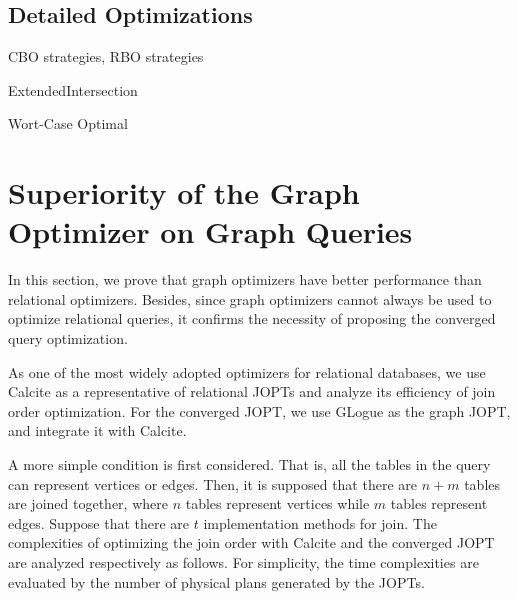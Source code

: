 \documentclass[sigconf, nonacm]{acmart}
\begin{document}
\subsection{Detailed Optimizations}

CBO strategies, RBO strategies

ExtendedIntersection

Wort-Case Optimal



\section{Superiority of the Graph Optimizer on Graph Queries}
\label{sec:theoretical-analysis}

In this section, we prove that graph optimizers have better performance than relational optimizers.
Besides, since graph optimizers cannot always be used to optimize relational queries, it confirms the necessity of proposing the converged query optimization.

As one of the most widely adopted optimizers for relational databases, we use Calcite \cite{calcite,columbia} as a representative of relational JOPTs and analyze its efficiency of join order optimization.
For the converged JOPT, we use GLogue \cite{GLogS} as the graph JOPT, and integrate it with Calcite.

A more simple condition is first considered.
That is, all the tables in the query can represent vertices or edges.
Then, it is supposed that there are $n + m$ tables are joined together, where $n$ tables represent vertices while $m$ tables represent edges.
Suppose that there are $t$ implementation methods for join.
The complexities of optimizing the join order with Calcite and the converged JOPT are analyzed respectively as follows.
For simplicity, the time complexities are evaluated by the number of physical plans generated by the JOPTs.
\end{document}
